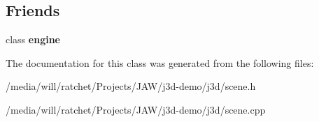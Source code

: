 \subsection*{Friends}
\begin{DoxyCompactItemize}
\item 
\hypertarget{classj3d_1_1Scene_a614ec0a1871249dee57baf50d4501271}{}class {\bfseries engine}\label{classj3d_1_1Scene_a614ec0a1871249dee57baf50d4501271}

\end{DoxyCompactItemize}


The documentation for this class was generated from the following files\+:\begin{DoxyCompactItemize}
\item 
/media/will/ratchet/\+Projects/\+J\+A\+W/j3d-\/demo/j3d/scene.\+h\item 
/media/will/ratchet/\+Projects/\+J\+A\+W/j3d-\/demo/j3d/scene.\+cpp\end{DoxyCompactItemize}
